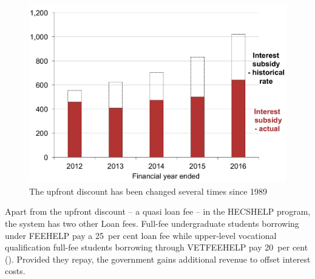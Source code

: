 \documentclass[embargoed]{grattan}
\begin{document}
\begin{figure}
\caption{The upfront discount has been changed several times since 1989}\label{fig:fig18-the-upfront-discount-has-been-changed-several-times-since-1989}

\includegraphics[page=18]{atlas/Chartpack.pdf}
\end{figure}

Apart from the upfront discount -- a quasi loan fee -- in the \gls{HECSHELP} program, the system has two other \gls{Loan fees}.
Full-fee undergraduate students borrowing under \gls{FEEHELP} pay a 25~per cent loan fee while upper-level vocational qualification full-fee students borrowing through \gls{VETFEEHELP} pay 20~per cent ().
Provided they repay, the government gains additional revenue to offset interest costs.
\end{document}

